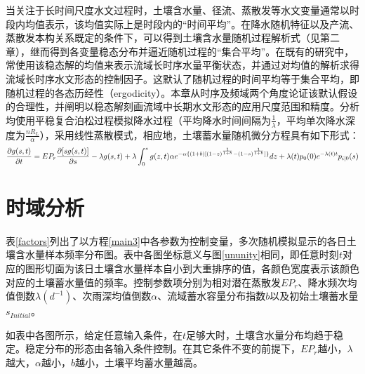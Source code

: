 当关注于长时间尺度水文过程时，土壤含水量、径流、蒸散发等水文变量通常以时段内均值表示，该均值实际上是时段内的``时间平均''。在降水随机特征以及产流、蒸散发本构关系既定的条件下，可以得到土壤含水量随机过程解析式（见第二章），继而得到各变量稳态分布并逼近随机过程的``集合平均''。在既有的研究中，常使用该稳态解的均值来表示流域长时序水量平衡状态，并通过对均值的解析求得流域长时序水文形态的控制因子\cite{porporato2004soil}。这默认了随机过程的时间平均等于集合平均，即随机过程的各态历经性（ergodicity）。本章从时序及频域两个角度论证该默认假设的合理性，并阐明以稳态解刻画流域中长期水文形态的应用尺度范围和精度。分析均使用平稳复合泊松过程模拟降水过程（平均降水时间间隔为$\frac{1}{\lambda}$，平均单次降水深度为$\frac{nR_L}{\alpha}$），采用线性蒸散模式，相应地，土壤蓄水量随机微分方程具有如下形式：
\begin{equation}\small
\label{main3}
\frac{\partial{g(s,t)}}{\partial t}=EP_r\frac{\partial{[sg(s,t)]}}{\partial s}-\lambda g(s,t)+\lambda \int_{0}^{s} g(z,t)\alpha e^{-\alpha \{(1+b) [(1-z)^{\frac{1}{1+b}}-(1-s)^{\frac{1}{1+b}} ] \}}dz+\lambda(t)p_0(0)e^{-\lambda(t) t}p_{i|0}(s)
\end{equation}



\section{时域分析}
\iffalse
方程\ref{main3}中各参数已定条件下，土壤含水量变化过程可以有不同的实现轨迹：
\begin{figure}[H]
\centering
\texttt{[image: monte.png]}
\caption{流域含水量随机过程模拟}
\label{ununity}
\end{figure}
\fi
表\ref{factors}列出了以方程\ref{main3}中各参数为控制变量，多次随机模拟显示的各日土壤含水量样本频率分布图。表中各图坐标意义与图\ref{ununity}相同，即任意时刻$t$对应的图形切面为该日土壤含水量样本自小到大重排序的值，各颜色宽度表示该颜色对应的土壤蓄水量值的频率。控制参数项分别为相对潜在蒸散发$EP_r$、降水频次均值倒数$\lambda(d^{-1})$、次雨深均值倒数$\alpha$、流域蓄水容量分布指数$b$以及初始土壤蓄水量$s_{Initial}$。

如表中各图所示，给定任意输入条件，在$t$足够大时，土壤含水量分布均趋于稳定。稳定分布的形态由各输入条件控制。在其它条件不变的前提下，$EP_r$越小，$\lambda$越大，$\alpha$越小，$b$越小，土壤平均蓄水量越高。



